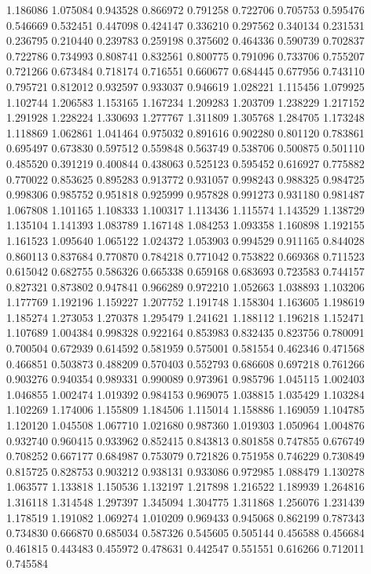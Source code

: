1.186086
1.075084
0.943528
0.866972
0.791258
0.722706
0.705753
0.595476
0.546669
0.532451
0.447098
0.424147
0.336210
0.297562
0.340134
0.231531
0.236795
0.210440
0.239783
0.259198
0.375602
0.464336
0.590739
0.702837
0.722786
0.734993
0.808741
0.832561
0.800775
0.791096
0.733706
0.755207
0.721266
0.673484
0.718174
0.716551
0.660677
0.684445
0.677956
0.743110
0.795721
0.812012
0.932597
0.933037
0.946619
1.028221
1.115456
1.079925
1.102744
1.206583
1.153165
1.167234
1.209283
1.203709
1.238229
1.217152
1.291928
1.228224
1.330693
1.277767
1.311809
1.305768
1.284705
1.173248
1.118869
1.062861
1.041464
0.975032
0.891616
0.902280
0.801120
0.783861
0.695497
0.673830
0.597512
0.559848
0.563749
0.538706
0.500875
0.501110
0.485520
0.391219
0.400844
0.438063
0.525123
0.595452
0.616927
0.775882
0.770022
0.853625
0.895283
0.913772
0.931057
0.998243
0.988325
0.984725
0.998306
0.985752
0.951818
0.925999
0.957828
0.991273
0.931180
0.981487
1.067808
1.101165
1.108333
1.100317
1.113436
1.115574
1.143529
1.138729
1.135104
1.141393
1.083789
1.167148
1.084253
1.093358
1.160898
1.192155
1.161523
1.095640
1.065122
1.024372
1.053903
0.994529
0.911165
0.844028
0.860113
0.837684
0.770870
0.784218
0.771042
0.753822
0.669368
0.711523
0.615042
0.682755
0.586326
0.665338
0.659168
0.683693
0.723583
0.744157
0.827321
0.873802
0.947841
0.966289
0.972210
1.052663
1.038893
1.103206
1.177769
1.192196
1.159227
1.207752
1.191748
1.158304
1.163605
1.198619
1.185274
1.273053
1.270378
1.295479
1.241621
1.188112
1.196218
1.152471
1.107689
1.004384
0.998328
0.922164
0.853983
0.832435
0.823756
0.780091
0.700504
0.672939
0.614592
0.581959
0.575001
0.581554
0.462346
0.471568
0.466851
0.503873
0.488209
0.570403
0.552793
0.686608
0.697218
0.761266
0.903276
0.940354
0.989331
0.990089
0.973961
0.985796
1.045115
1.002403
1.046855
1.002474
1.019392
0.984153
0.969075
1.038815
1.035429
1.103284
1.102269
1.174006
1.155809
1.184506
1.115014
1.158886
1.169059
1.104785
1.120120
1.045508
1.067710
1.021680
0.987360
1.019303
1.050964
1.004876
0.932740
0.960415
0.933962
0.852415
0.843813
0.801858
0.747855
0.676749
0.708252
0.667177
0.684987
0.753079
0.721826
0.751958
0.746229
0.730849
0.815725
0.828753
0.903212
0.938131
0.933086
0.972985
1.088479
1.130278
1.063577
1.133818
1.150536
1.132197
1.217898
1.216522
1.189939
1.264816
1.316118
1.314548
1.297397
1.345094
1.304775
1.311868
1.256076
1.231439
1.178519
1.191082
1.069274
1.010209
0.969433
0.945068
0.862199
0.787343
0.734830
0.666870
0.685034
0.587326
0.545605
0.505144
0.456588
0.456684
0.461815
0.443483
0.455972
0.478631
0.442547
0.551551
0.616266
0.712011
0.745584
